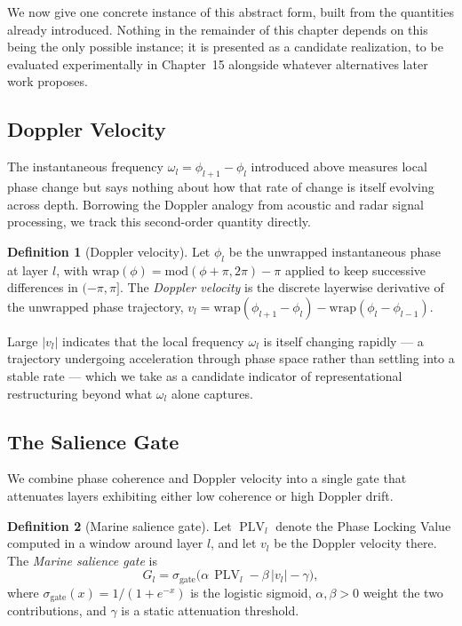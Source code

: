 \documentclass[11pt,twoside,openright]{book}
\numberwithin{equation}{chapter}
\theoremstyle{definition}
\newtheorem{definition}{Definition}[chapter]
\theoremstyle{plain}
\theoremstyle{remark}
\theoremstyle{definition}
\begin{document}
We now give one concrete instance of this abstract form, built from the
quantities already introduced. Nothing in the remainder of this chapter
depends on this being the only possible instance; it is presented as a
candidate realization, to be evaluated experimentally in Chapter~15
alongside whatever alternatives later work proposes.

\subsection{Doppler Velocity}

The instantaneous frequency $\omega_l=\phi_{l+1}-\phi_l$ introduced above
measures local phase change but says nothing about how that rate of
change is itself evolving across depth. Borrowing the Doppler analogy
from acoustic and radar signal processing, we track this second-order
quantity directly.

\begin{definition}[Doppler velocity]
Let $\phi_l$ be the unwrapped instantaneous phase at layer $l$, with
$\mathrm{wrap}(\phi)=\mathrm{mod}(\phi+\pi,2\pi)-\pi$ applied to keep
successive differences in $(-\pi,\pi]$. The \emph{Doppler velocity} is
the discrete layerwise derivative of the unwrapped phase trajectory,
$v_l=\mathrm{wrap}(\phi_{l+1}-\phi_l)-\mathrm{wrap}(\phi_l-\phi_{l-1})$.
\end{definition}

Large $|v_l|$ indicates that the local frequency $\omega_l$ is itself
changing rapidly --- a trajectory undergoing acceleration through phase
space rather than settling into a stable rate --- which we take as a
candidate indicator of representational restructuring beyond what
$\omega_l$ alone captures.

\subsection{The Salience Gate}

We combine phase coherence and Doppler velocity into a single gate that
attenuates layers exhibiting either low coherence or high Doppler drift.

\begin{definition}[Marine salience gate]
Let $\operatorname{PLV}_l$ denote the Phase Locking Value computed in a window
around layer $l$, and let $v_l$ be the Doppler velocity there. The
\emph{Marine salience gate} is
\[
G_l
=
\sigma_{\mathrm{gate}}
\big(
\alpha\,\operatorname{PLV}_l
-
\beta\,|v_l|
-
\gamma
\big),
\]
where $\sigma_{\mathrm{gate}}(x)=1/(1+e^{-x})$ is the logistic sigmoid,
$\alpha,\beta>0$ weight the two contributions, and $\gamma$ is a static
attenuation threshold.
\end{definition}
\end{document}
